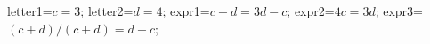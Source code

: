 \documentclass[exercice]{thedocument}%
\begin{document}
%
\>letter1=$c=3$;%
\>letter2=$d=4$;%
\>expr1=$c+d=3d-c$;%
\>expr2=$4c=3d$;%
\>expr3=$(c+d)/(c+d)=d-c$;%
%
\end{document}
